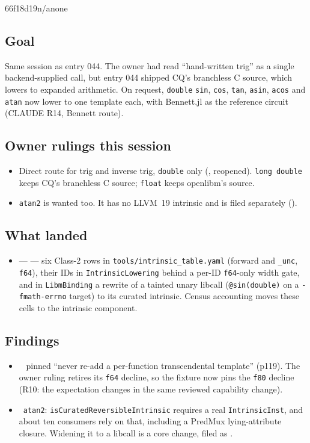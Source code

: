 %
  {66f18d19}{n/a}{none}

\subsection*{Goal}
Same session as entry 044. The owner had read ``hand-written trig'' as a single
backend-supplied call, but entry 044 shipped CQ's branchless C source, which lowers to
expanded arithmetic. On request, \texttt{double} \texttt{sin}, \texttt{cos}, \texttt{tan},
\texttt{asin}, \texttt{acos} and \texttt{atan} now lower to one template each, with Bennett.jl
as the reference circuit (CLAUDE R14, Bennett route).

\subsection*{Owner rulings this session}
\begin{itemize}
  \item Direct route for trig and inverse trig, \texttt{double} only (, reopened).
  \texttt{long double} keeps CQ's branchless C source; \texttt{float} keeps openlibm's source.
  \item \texttt{atan2} is wanted too. It has no LLVM~19 intrinsic and is filed separately
  ().
\end{itemize}

\subsection*{What landed}
\begin{itemize}
  \item {} ---  --- six Class-2 rows in
  \texttt{tools/intrinsic\_table.yaml} (forward and \texttt{\_unc}, \texttt{f64}), their IDs in
  \texttt{IntrinsicLowering} behind a per-ID \texttt{f64}-only width gate, and in
  \texttt{LibmBinding} a rewrite of a tainted unary libcall (\texttt{@sin(double)} on a
  \texttt{-fmath-errno} target) to its curated intrinsic. Census accounting moves these cells
  to the intrinsic component.
\end{itemize}

\subsection*{Findings}
\begin{itemize}
  \item \fdoc\  pinned
  ``never re-add a per-function transcendental template'' (p119). The owner ruling retires
  its \texttt{f64} decline, so the fixture now pins the \texttt{f80} decline (R10: the
  expectation changes in the same reviewed capability change).
  \item \foverdecline\ \texttt{atan2}: \texttt{isCuratedReversibleIntrinsic} requires a real
  \texttt{IntrinsicInst}, and about ten consumers rely on that, including a PredMux
  lying-attribute closure. Widening it to a libcall is a core change, filed as .
\end{itemize}

